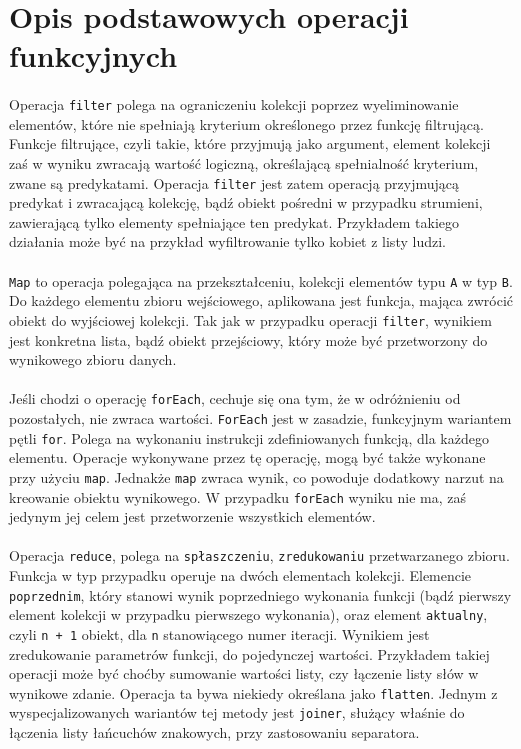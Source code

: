 \documentclass[a4paper,10pt]{report}
\begin{document}
\section{Opis podstawowych operacji funkcyjnych}
\paragraph{}
Operacja \verb|filter| polega na ograniczeniu kolekcji poprzez wyeliminowanie elementów, które nie spełniają kryterium określonego przez funkcję filtrującą. Funkcje filtrujące, czyli takie, które przyjmują jako argument, element kolekcji zaś w wyniku zwracają wartość logiczną, określającą spełnialność kryterium, zwane są predykatami. Operacja \verb|filter| jest zatem operacją przyjmującą predykat i zwracającą kolekcję, bądź obiekt pośredni w przypadku strumieni, zawierającą tylko elementy spełniające ten predykat. Przykładem takiego działania może być na przykład wyfiltrowanie tylko kobiet z listy ludzi.
\paragraph{}
\verb|Map| to operacja polegająca na przekształceniu, kolekcji elementów typu \verb|A| w typ \verb|B|. Do każdego elementu zbioru wejściowego, aplikowana jest funkcja, mająca zwrócić obiekt do wyjściowej kolekcji. Tak jak w przypadku operacji \verb|filter|, wynikiem jest konkretna lista, bądź obiekt przejściowy, który może być przetworzony do wynikowego zbioru danych.
\paragraph{}
Jeśli chodzi o operację \verb|forEach|, cechuje się ona tym, że w odróżnieniu od pozostałych, nie zwraca wartości. \verb|ForEach| jest w zasadzie, funkcyjnym wariantem pętli \verb|for|. Polega na wykonaniu instrukcji zdefiniowanych funkcją, dla każdego elementu. Operacje wykonywane przez tę operację, mogą być także wykonane przy użyciu \verb|map|. Jednakże \verb|map| zwraca wynik, co powoduje dodatkowy narzut na kreowanie obiektu wynikowego. W przypadku \verb|forEach| wyniku nie ma, zaś jedynym jej celem jest przetworzenie wszystkich elementów.
\paragraph{}
Operacja \verb|reduce|, polega na \verb|spłaszczeniu|, \verb|zredukowaniu| przetwarzanego zbioru. Funkcja w typ przypadku operuje na dwóch elementach kolekcji. Elemencie \verb|poprzednim|, który stanowi wynik poprzedniego wykonania funkcji (bądź pierwszy element kolekcji w przypadku pierwszego wykonania), oraz element \verb|aktualny|, czyli \verb|n + 1| obiekt, dla \verb|n| stanowiącego numer iteracji. Wynikiem jest zredukowanie parametrów funkcji, do pojedynczej wartości. Przykładem takiej operacji może być choćby sumowanie wartości listy, czy łączenie listy słów w wynikowe zdanie. Operacja ta bywa niekiedy określana jako \verb|flatten|. Jednym z wyspecjalizowanych wariantów tej metody jest \verb|joiner|, służący właśnie do łączenia listy łańcuchów znakowych, przy zastosowaniu separatora.
\end{document}
